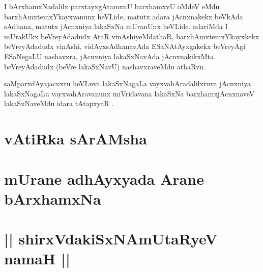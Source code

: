 
\begin{artha}
I bArxhamxNadalilx parxtayxgAtamxnU barxhamxvU oMdeV eMdu barxhAmxtemxYkayxvanunx heVLide, matutx adara jAcnxnakekx beVkAda sAdhana, matutx jAcnxniya lakaSxNa mUranUnx heVLide. adariMda I mUrakUkx beVreyAdadudx AtaR vinAshiyeMdathaR, barxhAmxtemxYkayxkekx beVreyAdadudx vinAshi, vidAyxsAdhanavAda ESaNAtAyxgakekx beVreyAgi ESaNegaLU nashavxra, jAcnxniya lakaSxNavAda jAcnxnakikxMta beVreyAdadudx (beVre lakaSxNavU) nashavxraveMdu athaRvu.
\end{artha}

\begin{artha}
saMparxdAyajacnxru heVLuva lakaSxNagaLa vayxvahAradalilxruva jAcnxniya lakaSxNagaLu vayxvahAravanunx miVridavana lakaSxNa barxhamxjAcnxnaveV lakaSxNaveMdu idara tAtapxyaR .
\end{artha}


\section*{vAtiRka sArAMsha}

\section*{mUrane adhAyxyada Arane bArxhamxNa}

\section*{|| shirxVdakiSxNAmUtaRyeV namaH ||}

